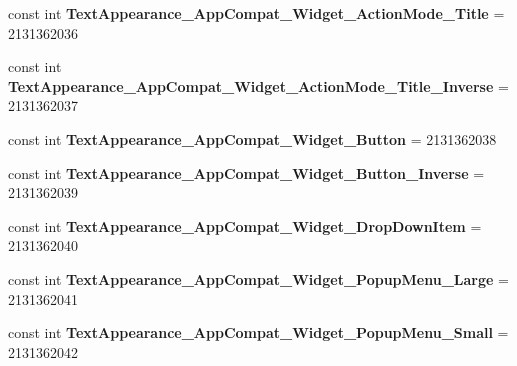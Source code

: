 \begin{DoxyCompactItemize}
\mbox{\label{class_pinned_app_1_1_droid_1_1_resource_1_1_style_a0c479c5154ad8d6d8f99340763f54e3a}} 
const int {\bfseries Text\+Appearance\+\_\+\+App\+Compat\+\_\+\+Widget\+\_\+\+Action\+Mode\+\_\+\+Title} = 2131362036
\item 
\mbox{\label{class_pinned_app_1_1_droid_1_1_resource_1_1_style_a6bedeef4c1357153b8d679bfcd639913}} 
const int {\bfseries Text\+Appearance\+\_\+\+App\+Compat\+\_\+\+Widget\+\_\+\+Action\+Mode\+\_\+\+Title\+\_\+\+Inverse} = 2131362037
\item 
\mbox{\label{class_pinned_app_1_1_droid_1_1_resource_1_1_style_ac3fc674d6e17c333bd1617e26b2380b7}} 
const int {\bfseries Text\+Appearance\+\_\+\+App\+Compat\+\_\+\+Widget\+\_\+\+Button} = 2131362038
\item 
\mbox{\label{class_pinned_app_1_1_droid_1_1_resource_1_1_style_ab5f224c86a431191dfd7233c3808b88c}} 
const int {\bfseries Text\+Appearance\+\_\+\+App\+Compat\+\_\+\+Widget\+\_\+\+Button\+\_\+\+Inverse} = 2131362039
\item 
\mbox{\label{class_pinned_app_1_1_droid_1_1_resource_1_1_style_a6e7a372784acfdba564ba87c07072e03}} 
const int {\bfseries Text\+Appearance\+\_\+\+App\+Compat\+\_\+\+Widget\+\_\+\+Drop\+Down\+Item} = 2131362040
\item 
\mbox{\label{class_pinned_app_1_1_droid_1_1_resource_1_1_style_afaf6e5a80c0ffce3d0237fa110da3bd0}} 
const int {\bfseries Text\+Appearance\+\_\+\+App\+Compat\+\_\+\+Widget\+\_\+\+Popup\+Menu\+\_\+\+Large} = 2131362041
\item 
\mbox{\label{class_pinned_app_1_1_droid_1_1_resource_1_1_style_a8a697da789ec474f31e7f68bd4f1d068}} 
const int {\bfseries Text\+Appearance\+\_\+\+App\+Compat\+\_\+\+Widget\+\_\+\+Popup\+Menu\+\_\+\+Small} = 2131362042
\item 
\mbox{\label{class_pinned_app_1_1_droid_1_1_resource_1_1_style_a79cd9b9c98cdd0befbfd84565ee19d9b}} 

\end{DoxyCompactItemize}
